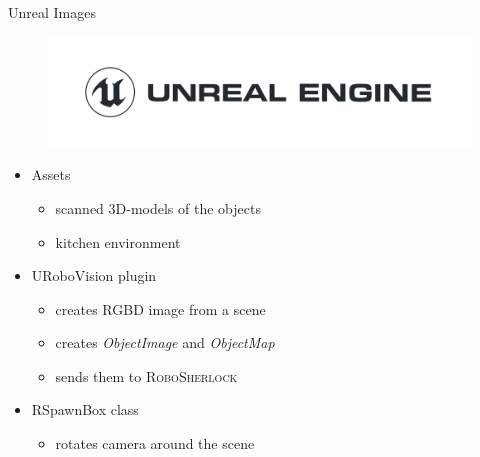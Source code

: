 \documentclass[]{beamer}
\begin{document}
\begin{frame}{Unreal Images}
	\begin{figure}
		\includegraphics[scale=.12]{img/Unreal_Engine_Horiz_Black.png}
	\end{figure}
	\begin{itemize}
		\item<1-> Assets
			\begin{itemize}
				\item scanned 3D-models of the objects
				\item kitchen environment
			\end{itemize}
		\item<2-> URoboVision plugin
			\begin{itemize}
				\item creates RGBD image from a scene
				\item creates \textit{ObjectImage} and  \textit{ObjectMap} 
				\item sends them to \textsc{RoboSherlock}
			\end{itemize}
		\item<3-> RSpawnBox class
			\begin{itemize}
				\item rotates camera around the scene
			\end{itemize}
	\end{itemize}
\end{frame}
\end{document}
